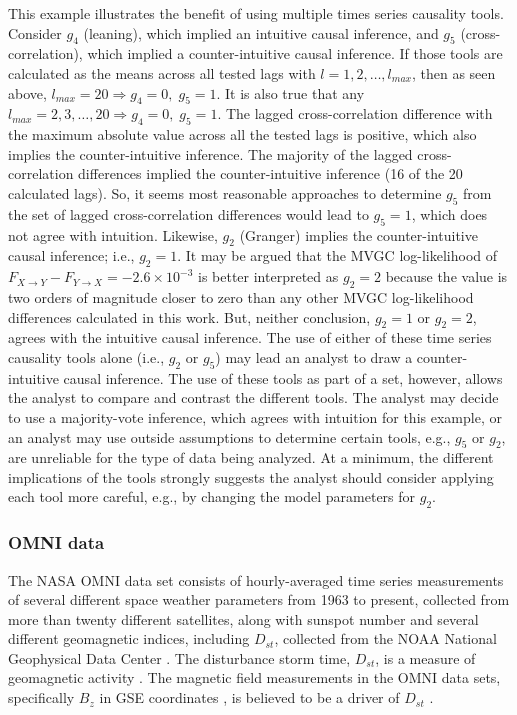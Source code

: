 \documentclass{article}[10pt]
\begin{document}
This example illustrates the benefit of using multiple times series causality tools.  Consider $g_4$ (leaning), which implied an intuitive causal inference, and $g_5$ (cross-correlation), which implied a counter-intuitive causal inference.  If those tools are calculated as the means across all tested lags with $l=1,2,\ldots,l_{max}$, then as seen above, $l_{max}=20\Rightarrow g_4=0,\;g_5=1$.  It is also true that any $l_{max}=2,3,\ldots,20\Rightarrow g_4=0,\;g_5=1$.  The lagged cross-correlation difference with the maximum absolute value across all the tested lags is positive, which also implies the counter-intuitive inference.  The majority of the lagged cross-correlation differences implied the counter-intuitive inference (16 of the 20 calculated lags).  So, it seems most reasonable approaches to determine $g_5$ from the set of lagged cross-correlation differences would lead to $g_5=1$, which does not agree with intuition.  Likewise, $g_2$ (Granger) implies the counter-intuitive causal inference; i.e., $g_2=1$.  It may be argued that the MVGC log-likelihood of $F_{X\rightarrow Y}-F_{Y\rightarrow X}=-2.6\times 10^{-3}$ is better interpreted as $g_2=2$ because the value is two orders of magnitude closer to zero than any other MVGC log-likelihood differences calculated in this work.  But, neither conclusion, $g_2=1$ or $g_2=2$, agrees with the intuitive causal inference.  The use of either of these time series causality tools alone (i.e., $g_2$ or $g_5$) may lead an analyst to draw a counter-intuitive causal inference.  The use of these tools as part of a set, however, allows the analyst to compare and contrast the different tools.  The analyst may decide to use a majority-vote inference, which agrees with intuition for this example, or an analyst may use outside assumptions to determine certain tools, e.g., $g_5$ or $g_2$, are unreliable for the type of data being analyzed.  At a minimum, the different implications of the tools strongly suggests the analyst should consider applying each tool more careful, e.g., by changing the model parameters for $g_2$.

\subsubsection{OMNI data}
The NASA OMNI data set consists of hourly-averaged time series measurements of several different space weather parameters from 1963 to present, collected from more than twenty different satellites, along with sunspot number and several different geomagnetic indices, including $D_{st}$, collected from the NOAA National Geophysical Data Center \cite{King2005}.  The disturbance storm time, $D_{st}$, is a measure of geomagnetic activity \cite{IAGA}.  The magnetic field measurements in the OMNI data sets, specifically $B_z$ in GSE coordinates \cite{Hapgood1992}, is believed to be a driver of $D_{st}$ \cite{Gonz1994}.
\end{document}
